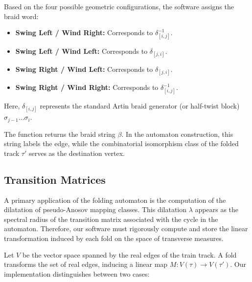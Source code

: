 \begin{enumerate}
    Based on the four possible geometric configurations, the software assigns the braid word:
    \begin{itemize}
        \item \textbf{Swing Left / Wind Right:} Corresponds to $\delta_{[i, j]}^{-1}$.
        \item \textbf{Swing Left / Wind Left:} Corresponds to $\delta_{[j, i]}$.
        \item \textbf{Swing Right / Wind Left:} Corresponds to $\delta_{[j, i]}$.
        \item \textbf{Swing Right / Wind Right:} Corresponds to $\delta_{[i, j]}^{-1}$.
    \end{itemize}
    Here, $\delta_{[i,j]}$ represents the standard Artin braid generator (or half-twist block) $\sigma_{j-1} \dots \sigma_i$.
\end{enumerate}

The function returns the braid string $\beta$. In the automaton construction, this string labels the edge, while the combinatorial isomorphism class of the folded track $\tau'$ serves as the destination vertex.

\subsection{Transition Matrices}
\label{subsec:transition_matrices}

A primary application of the folding automaton is the computation of the dilatation of pseudo-Anosov mapping classes. This dilatation $\lambda$ appears as the spectral radius of the transition matrix associated with the cycle in the automaton. Therefore, our software must rigorously compute and store the linear transformation induced by each fold on the space of transverse measures.

Let $V$ be the vector space spanned by the real edges of the train track. A fold transforms the set of real edges, inducing a linear map $M: V(\tau) \to V(\tau')$. Our implementation distinguishes between two cases:

